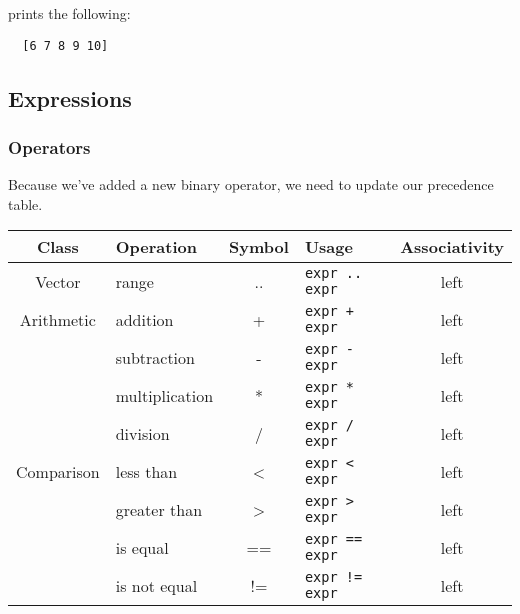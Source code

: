\documentclass{article}
\begin{document}
prints the following:
\begin{lstlisting}
  [6 7 8 9 10]
\end{lstlisting}

\subsection{Expressions}
\subsubsection{Operators}
Because we've added a new binary operator, we need to update our precedence table.
\begin{center}
  \begin{tabular}{|c|l|c|l|c|}
    \hline
    \textbf{Class} & \textbf{Operation} & \textbf{Symbol} & \textbf{Usage} &
      \textbf{Associativity} \\
    \hline
    Vector
    &range          & .. & \texttt{expr .. expr} & left \\
    \hline
    Arithmetic
    &addition       & + & \texttt{expr + expr} & left \\
    &subtraction    & - & \texttt{expr - expr} & left \\
    &multiplication & * & \texttt{expr * expr} & left \\
    &division       & / & \texttt{expr / expr} & left \\
    \hline
    Comparison
    &less than      & <  & \texttt{expr < expr}  & left \\
    &greater than   & >  & \texttt{expr > expr}  & left \\
    &is equal       & == & \texttt{expr == expr} & left \\
    &is not equal   & != & \texttt{expr != expr} & left \\
    \hline
  \end{tabular}
\end{center}
\end{document}
